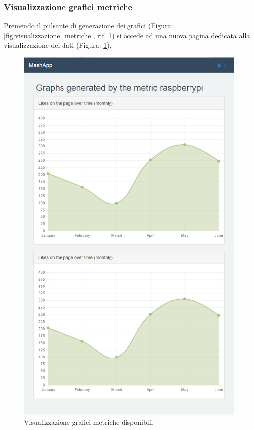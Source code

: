 		\subsubsection{Visualizzazione grafici metriche} %
		\label{sec:visualizzazione_grafici_metriche}
			Premendo il pulsante di generazione dei grafici (Figura: \ref{fig:visualizzazione_metriche}, rif. 1) si accede ad una nuova pagina dedicata alla visualizzazione dei dati (Figura: \ref{fig:visualizzazione_grafici_metriche}).
			\begin{figure}[H]
				\centering
				\centerline{\includegraphics[width=14cm]{images/visualizzazione_grafici_metriche.png}}
				\caption{Visualizzazione grafici metriche disponibili}
				\label{fig:visualizzazione_grafici_metriche}
			\end{figure}
